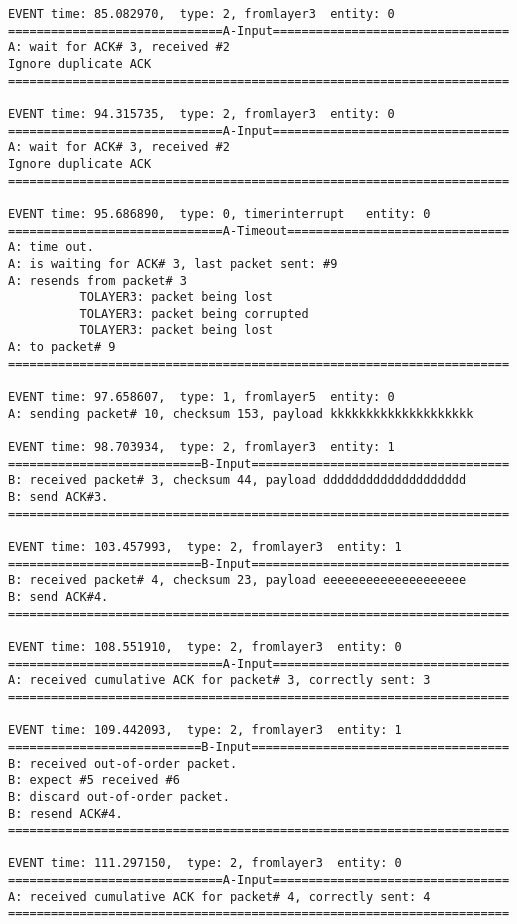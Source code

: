 \documentclass[12pt]{article}
\begin{document}
\begin{verbatim}
EVENT time: 85.082970,  type: 2, fromlayer3  entity: 0
==============================A-Input=================================
A: wait for ACK# 3, received #2
Ignore duplicate ACK
======================================================================

EVENT time: 94.315735,  type: 2, fromlayer3  entity: 0
==============================A-Input=================================
A: wait for ACK# 3, received #2
Ignore duplicate ACK
======================================================================

EVENT time: 95.686890,  type: 0, timerinterrupt   entity: 0
==============================A-Timeout===============================
A: time out. 
A: is waiting for ACK# 3, last packet sent: #9
A: resends from packet# 3 
          TOLAYER3: packet being lost
          TOLAYER3: packet being corrupted
          TOLAYER3: packet being lost
A: to packet# 9
======================================================================

EVENT time: 97.658607,  type: 1, fromlayer5  entity: 0
A: sending packet# 10, checksum 153, payload kkkkkkkkkkkkkkkkkkkk

EVENT time: 98.703934,  type: 2, fromlayer3  entity: 1
===========================B-Input====================================
B: received packet# 3, checksum 44, payload dddddddddddddddddddd
B: send ACK#3.
======================================================================

EVENT time: 103.457993,  type: 2, fromlayer3  entity: 1
===========================B-Input====================================
B: received packet# 4, checksum 23, payload eeeeeeeeeeeeeeeeeeee
B: send ACK#4.
======================================================================

EVENT time: 108.551910,  type: 2, fromlayer3  entity: 0
==============================A-Input=================================
A: received cumulative ACK for packet# 3, correctly sent: 3
======================================================================

EVENT time: 109.442093,  type: 2, fromlayer3  entity: 1
===========================B-Input====================================
B: received out-of-order packet.
B: expect #5 received #6
B: discard out-of-order packet.
B: resend ACK#4.
======================================================================

EVENT time: 111.297150,  type: 2, fromlayer3  entity: 0
==============================A-Input=================================
A: received cumulative ACK for packet# 4, correctly sent: 4
======================================================================


\end{verbatim}
\end{document}
